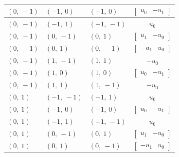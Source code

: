 \documentclass[11pt]{article}
\theoremstyle{definition}
\begin{document}
\begin{longtable}{|l|l|l|c|}
    \hline
    $\left( 0, \  -1\right)$ & $\left( -1, \  0\right)$ & $\left( -1, \  0\right)$ & $\left[\begin{matrix}u_{0} & - u_{1}\end{matrix}\right]$ \\
    \hline
    $\left( 0, \  -1\right)$ & $\left( -1, \  1\right)$ & $\left( -1, \  -1\right)$ & $u_{0}$ \\
    \hline
    $\left( 0, \  -1\right)$ & $\left( 0, \  -1\right)$ & $\left( 0, \  1\right)$ & $\left[\begin{matrix}u_{1} & - u_{0}\end{matrix}\right]$ \\
    \hline
    $\left( 0, \  -1\right)$ & $\left( 0, \  1\right)$ & $\left( 0, \  -1\right)$ & $\left[\begin{matrix}- u_{1} & u_{0}\end{matrix}\right]$ \\
    \hline
    $\left( 0, \  -1\right)$ & $\left( 1, \  -1\right)$ & $\left( 1, \  1\right)$ & $- u_{0}$ \\
    \hline
    $\left( 0, \  -1\right)$ & $\left( 1, \  0\right)$ & $\left( 1, \  0\right)$ & $\left[\begin{matrix}u_{0} & - u_{1}\end{matrix}\right]$ \\
    \hline
    $\left( 0, \  -1\right)$ & $\left( 1, \  1\right)$ & $\left( 1, \  -1\right)$ & $- u_{0}$ \\
    \hline
    $\left( 0, \  1\right)$ & $\left( -1, \  -1\right)$ & $\left( -1, \  1\right)$ & $u_{0}$ \\
    \hline
    $\left( 0, \  1\right)$ & $\left( -1, \  0\right)$ & $\left( -1, \  0\right)$ & $\left[\begin{matrix}u_{0} & - u_{1}\end{matrix}\right]$ \\
    \hline
    $\left( 0, \  1\right)$ & $\left( -1, \  1\right)$ & $\left( -1, \  -1\right)$ & $u_{0}$ \\
    \hline
    $\left( 0, \  1\right)$ & $\left( 0, \  -1\right)$ & $\left( 0, \  1\right)$ & $\left[\begin{matrix}u_{1} & - u_{0}\end{matrix}\right]$ \\
    \hline
    $\left( 0, \  1\right)$ & $\left( 0, \  1\right)$ & $\left( 0, \  -1\right)$ & $\left[\begin{matrix}- u_{1} & u_{0}\end{matrix}\right]$ \\

\end{longtable}
\end{document}
